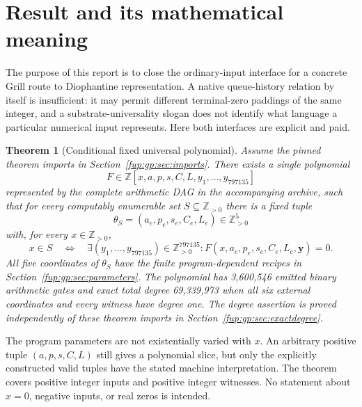 \documentclass[11pt,letterpaper]{article}
\newtheorem{theorem}{Theorem}[section]
\theoremstyle{definition}\newtheorem{definition}[theorem]{Definition}
\theoremstyle{remark}\newtheorem{remark}[theorem]{Remark}
\newcommand{\Z}{\mathbb Z}\newcommand{\Np}{\mathbb Z_{>0}}
\begin{document}
\section{Result and its mathematical meaning}
The purpose of this report is to close the ordinary-input interface for a concrete Grill route to Diophantine representation. A native queue-history relation by itself is insufficient: it may permit different terminal-zero paddings of the same integer, and a substrate-universality slogan does not identify what language a particular numerical input represents. Here both interfaces are explicit and paid.

\begin{theorem}[Conditional fixed universal polynomial]\label{fup:gp:thm:main}
Assume the pinned theorem imports in Section~\ref{fup:gp:sec:imports}. There exists a single polynomial
\[
 F\in\Z[x,a,p,s,C,L,y_1,\ldots,y_{797135}]
\]
represented by the complete arithmetic DAG in the accompanying archive, such that for every computably enumerable set $S\subseteq\Np$ there is a fixed tuple
\[
 \theta_S=(a_e,p_e,s_e,C_e,L_e)\in\Np^5
\]
with, for every $x\in\Np$,
\[
 x\in S\quad\Longleftrightarrow\quad
 \exists(y_1,\ldots,y_{797135})\in\Np^{797135}:
 F(x,a_e,p_e,s_e,C_e,L_e,\mathbf y)=0.
\]
All five coordinates of $\theta_S$ have the finite program-dependent recipes in Section~\ref{fup:gp:sec:parameters}. The polynomial has 3,600,546 emitted binary arithmetic gates and exact total degree 69,339,973 when all six external coordinates and every witness have degree one. The degree assertion is proved independently of these theorem imports in Section~\ref{fup:gp:sec:exactdegree}.
\end{theorem}

The program parameters are not existentially varied with $x$. An arbitrary positive tuple $(a,p,s,C,L)$ still gives a polynomial slice, but only the explicitly constructed valid tuples have the stated machine interpretation. The theorem covers positive integer inputs and positive integer witnesses. No statement about $x=0$, negative inputs, or real zeros is intended.
\end{document}
